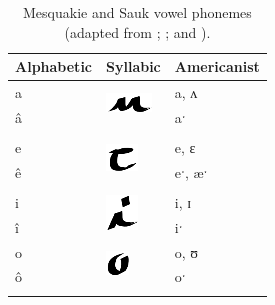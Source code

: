 \documentclass[output=paper]{LSP/langsci}
\begin{document}
\begin{table}
\begin{tabular}{lll}
\lsptoprule
Alphabetic & Syllabic & Americanist\\
\midrule
a & \multirow{2}{*}{\includegraphics{figures/Danker2a}} & a, ʌ\\
â && aˑ\\ \\
e & \multirow{2}{*}{\includegraphics{figures/Danker2e}} & e, ɛ\\
ê && eˑ, æˑ\\ \\
i & \multirow{2}{*}{\includegraphics{figures/Danker2i}} & i, ɪ\\
î && iˑ\\
o & \multirow{2}{*}{\includegraphics{figures/Danker2o}} & o, ʊ\\
ô && oˑ\\
\lspbottomrule
\end{tabular}
\caption{Mesquakie and Sauk vowel phonemes (adapted from \citealt{NatLangMeskSauk}; \citealt{Susman1939}; and \citealt{Jones1906}).}
\label{mesquakiesaukvowels}
\end{table}
\end{document}
